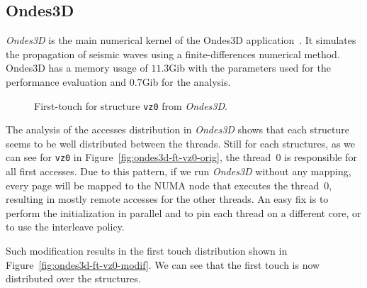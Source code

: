 \subsection{Ondes3D}
\label{sec:exp-ondes3d}

\emph{Ondes3D} is the main numerical kernel of the Ondes3D
application~\cite{Dupros2008}. It simulates the propagation of seismic waves
using a finite-differences numerical method. Ondes3D has a memory usage of
$11.3$Gib with the parameters used for the performance evaluation and $0.7$Gib
for the analysis.

\begin{figure}[htb]
    \centering

    \caption{First-touch for structure
        \texttt{vz0} from \emph{Ondes3D}.} %
    \label{fig:ondes3d}
\end{figure}

The analysis of the accesses distribution in \emph{Ondes3D} shows that each
structure seems to be well distributed between the threads. %
Still for each structures, as we can see for \texttt{vz0} in
Figure~\ref{fig:ondes3d-ft-vz0-orig}, the
thread~$0$ is responsible for all first accesses. Due to
this pattern, if we run \emph{Ondes3D} without any mapping, every page will be
mapped to the NUMA node that executes the thread~$0$, resulting in mostly remote
accesses for the other threads. An easy fix is to perform the initialization
in parallel and to pin each thread on a different core, or to use the
interleave policy.

Such modification results in the first touch distribution shown in
Figure~\ref{fig:ondes3d-ft-vz0-modif}. We can see that the first touch is now distributed
over the structures.


